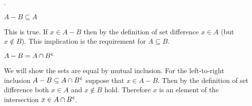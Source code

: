 \documentclass{test}  %
\begin{document}

\begin{problem} \pord.
\begin{exes}
\begin{exercise} 
  $A-B\subseteq A$
\end{exercise}
\begin{answer}
  This is true.
  If $x\in A-B$
  then by the definition of set difference $x\in A$ (but $x\notin B$).
  This implication is the requirement for $A\subseteq B$.  
\end{answer}
\begin{exercise} 
  $A-B=A\cap{B}^{\mspace{1mu}\mathsf{c}}$
\end{exercise}
\begin{answer}
  We will show the sets are equal by mutual inclusion.
  For the left-to-right inclusion $A-B\subseteq A\cap {B}^{\mspace{1mu}\mathsf{c}}$
  suppose that $x\in A-B$.
  Then by the definition of set difference both $x\in A$ and $x\notin B$ hold.
  Therefore $x$ is an element of the intersection 
  $x\in A\cap{B}^{\mspace{1mu}\mathsf{c}}$.
  

\end{answer}
\end{exes}
\end{problem}
\end{document}
